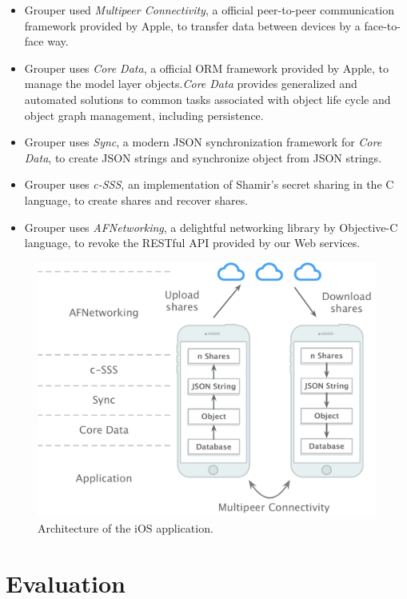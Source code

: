 \documentclass[twocolumn,10pt]{article}
\begin{document}
\begin{itemize}
	\setlength{\itemsep}{1pt}
	\setlength{\parskip}{0pt}
	\setlength{\parsep}{0pt}
	\item Grouper used \emph{Multipeer Connectivity}\cite{mc},  a official peer-to-peer communication framework provided by Apple, to transfer data between devices by a face-to-face way.
	\item Grouper uses \emph{Core Data}\cite{coredata}, a official ORM framework provided by Apple, to manage the model layer objects.\emph{Core Data} provides generalized and automated solutions to common tasks associated with object life cycle and object graph management, including persistence.
	\item Grouper uses \emph{Sync}\cite{sync}, a modern JSON synchronization framework for \emph{Core Data}, to create JSON strings and synchronize object from JSON strings.
	\item Grouper uses \emph{c-SSS}\cite{c-sss}, an implementation of Shamir's secret sharing in the C language, to create shares and recover shares.
	\item Grouper uses \emph{AFNetworking}\cite{afnetworking}, a delightful networking library by Objective-C language, to revoke the RESTful API provided by our Web services. 
\end{itemize}

 \begin{figure}[!htb]
	\centering
	\includegraphics[scale=0.35]{architecture}
	\caption{Architecture of the iOS application.}
\end{figure}

\section{Evaluation}
\end{document}
